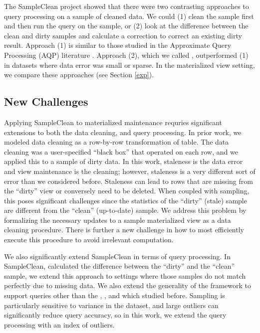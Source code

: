 The SampleClean project showed that there were two contrasting approaches to query processing on a sample of cleaned data.
We could (1) clean the sample first and then run the query on the sample, or (2) look at the difference between the clean and dirty samples and calculate a correction to correct an existing dirty result. 
Approach (1) is similar to those studied in the Approximate Query Processing (AQP) literature \cite{OlkenR86,AgarwalMPMMS13, joshi2008materialized}.
Approach (2), which we called \nsc, outperformed (1) in datasets where data error was small or sparse.
In the materialized view setting, we compare these approaches (see Section \ref{exp}). 


\subsection{New Challenges}
Applying SampleClean to materialized maintenance requries significant extensions to both the data cleaning, and query processing.
In prior work, we modeled data cleaning as a row-by-row transformation of table.
The data cleaning was a user-specified  ``black box'' that operated on each row, and we applied this to a sample of dirty data.
In this work, staleness is the data error and view maintenance is the cleaning; however, staleness is a very different sort of error than we considered before.
Staleness can lead to rows that are missing from the ``dirty'' view or conversely need to be deleted.
When coupled with sampling, this poses significant challenges since the statistics of the ``dirty'' (stale) sample are different from the ``clean'' (up-to-date) sample.
We address this problem by formalizing the necessary updates to a sample materialized view as a data cleaning procedure.
There is further a new challenge in how to most efficiently execute this procedure to avoid irrelevant computation. 

We also significantly extend SampleClean in terms of query processing.
In SampleClean, \nsc calculated the difference between the ``dirty'' and the ``clean'' sample, we extend this approach to settings where those samples do not match perfectly due to missing data.
We also extend the generality of the framework to support queries other than the \sumfunc, \avgfunc, and \countfunc which studied before.
Sampling is particularly sensitive to variance in the dataset, and large outliers can significantly reduce query accuracy, so in this work, we extend the query processing with an index of outliers.

